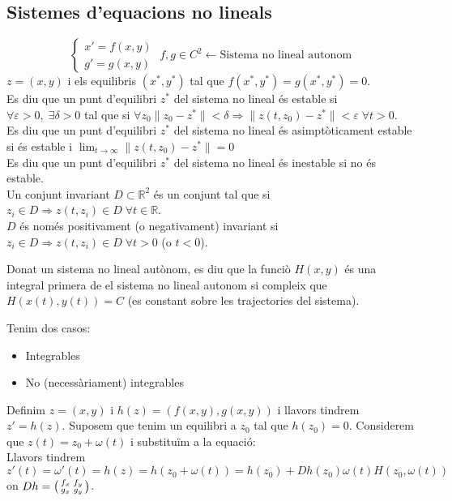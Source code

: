 \documentclass[../main.tex]{subfiles}
\begin{document}
\subsection{Sistemes d'equacions no lineals}
\begin{displaymath}
	\begin{cases}
		x' = f(x, y)\\
		g' = g(x, y)
	\end{cases}\; f, g \in C^2 \leftarrow \text{Sistema no lineal autonom}
\end{displaymath}
$z = (x,y)$ i els equilibris $(x^*, y^*)$ tal que $f(x^*, y^*) = g(x^*, y^*) = 0$.\\
Es diu que un punt d'equilibri $z^*$ del sistema no lineal és estable si $\forall \varepsilon > 0,\;\exists \delta > 0$ tal que si $\forall z_0 \|z_0 - z^*\| < \delta \Rightarrow \|z(t, z_0) - z^*\| < \varepsilon\;\forall t > 0$.\\
Es diu que un punt d'equilibri $z^*$ del sistema no lineal és asimptòticament estable si és estable i $\lim_{t \to \infty} \|z(t, z_0)-z^*\| = 0$\\
Es diu que un punt d'equilibri $z^*$ del sistema no lineal és inestable si no és estable.\\
Un conjunt invariant $D \subset \mathbb{R}^2$ és un conjunt tal que si $z_i \in D \Rightarrow z(t, z_i) \in D\;\forall t \in \mathbb{R}$.\\
$D$ és només positivament (o negativament) invariant si $z_i \in D \Rightarrow z(t, z_i) \in D\;\forall t > 0$ (o $t < 0$).\\
\begin{definicio}
	Donat un sistema no lineal autònom, es diu que la funciò $H(x,y)$ és una integral primera de el sistema no lineal autonom si compleix que $H(x(t), y(t))=C$ (es constant sobre les trajectories del sistema).
\end{definicio}
Tenim dos casos:
\begin{itemize}
\item Integrables
\item No (necessàriament) integrables
\end{itemize}
Definim $z = (x,y)$ i $h(z) = (f(x,y), g(x,y))$ i llavors tindrem $z' = h(z)$. Suposem que tenim un equilibri a $z_0$ tal que $h(z_0) = 0$. Considerem que $z(t) = z_0 + \omega(t)$ i substituïm a la equació:\\
Llavors tindrem $z'(t) = \omega'(t) = h(z) = h(z_0 + \omega(t)) = h(z_0) + Dh(z_0)\omega(t) H(z_0, \omega(t))$ on $Dh = \begin{psmallmatrix}f_x & f_y\\g_x&g_y\end{psmallmatrix}$.\\
\end{document}
